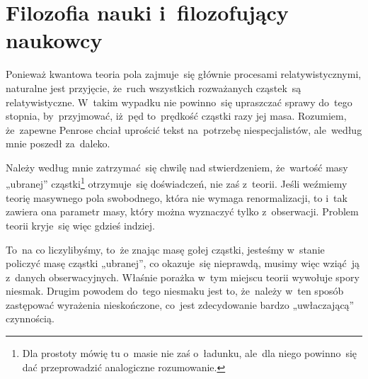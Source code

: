 \documentclass[a4paper,11pt]{article}
\begin{document}
\vspace{\spaceTwo}










\newpage
\section{Filozofia nauki i~filozofujący naukowcy}

\vspace{\spaceTwo}







\start {} Ponieważ kwantowa teoria pola zajmuje~się
głównie procesami relatywistycznymi, naturalne jest przyjęcie, że~ruch
wszystkich rozważanych cząstek~są relatywistyczne. W~takim wypadku nie
powinno~się upraszczać sprawy do~tego stopnia, by~przyjmować, iż~pęd
to~prędkość cząstki razy jej masa. Rozumiem, że~zapewne Penrose chciał
uprościć tekst na~potrzebę niespecjalistów, ale~według mnie poszedł
za~daleko.

\vspace{\spaceFour}





\start {} Należy według mnie zatrzymać~się chwilę nad
stwierdzeniem, że~wartość masy „ubranej” cząstki\footnote{Dla
  prostoty mówię tu o~masie nie zaś o~ładunku, ale~dla niego
  powinno~się dać przeprowadzić analogiczne rozumowanie.}
otrzymuje~się doświadczeń, nie zaś z~teorii. Jeśli weźmiemy teorię
masywnego pola swobodnego, która nie wymaga renormalizacji, to i~tak
zawiera ona parametr masy, który można wyznaczyć tylko z~obserwacji.
Problem teorii kryje~się więc gdzieś indziej.

To~na co liczylibyśmy, to~że znając masę gołej cząstki, jesteśmy
w~stanie policzyć masę cząstki „ubranej”, co okazuje~się nieprawdą,
musimy więc wziąć~ją z~danych obserwacyjnych. Właśnie porażka w~tym
miejscu teorii wywołuje spory niesmak. Drugim powodem do~tego niesmaku
jest to, że~należy w~ten sposób zastępować wyrażenia nieskończone,
co~jest zdecydowanie bardzo „uwłaczającą” czynnością.
\end{document}
